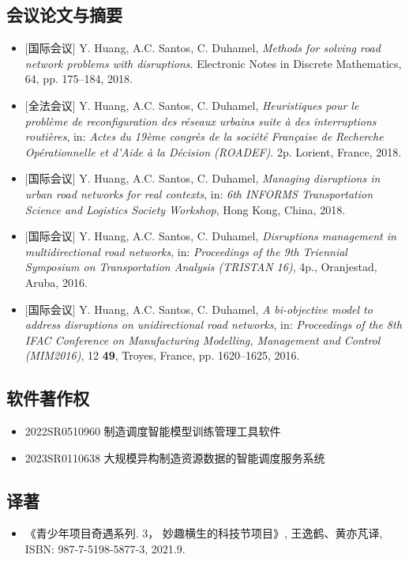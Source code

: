 \documentclass[letterpaper]{twentysecondcv} %
\begin{document}
\subsection{会议论文与摘要}
\begin{itemize}
    \item $[$国际会议$]$ Y. Huang, A.C. Santos, C. Duhamel, \textit{Methods for solving road network problems with disruptions}. Electronic Notes in Discrete Mathematics, 64, pp. 175--184, 2018.
    \item $[$全法会议$]$ Y. Huang, A.C. Santos, C. Duhamel, \textit{Heuristiques pour le problème de reconfiguration des réseaux urbains suite à des interruptions routières}, in: \textit{Actes du 19ème congrès de la société Française de Recherche Opérationnelle et d'Aide à la Décision (ROADEF)}. 2p. Lorient, France, 2018.
    \item $[$国际会议$]$ Y. Huang, A.C. Santos, C. Duhamel, \textit{Managing disruptions in urban road networks for real contexts}, in: \textit{6th INFORMS Transportation Science and Logistics Society Workshop}, Hong Kong, China, 2018.
    \item $[$国际会议$]$ Y. Huang, A.C. Santos, C. Duhamel, \textit{Disruptions management in multidirectional road networks}, in: \textit{Proceedings of the 9th Triennial Symposium on Transportation Analysis (TRISTAN 16)}, 4p., Oranjestad, Aruba, 2016.
    \item $[$国际会议$]$ Y. Huang, A.C. Santos, C. Duhamel, \textit{A bi-objective model to address disruptions on unidirectional road networks}, in: \textit{Proceedings of the 8th IFAC Conference on Manufacturing Modelling, Management and Control (MIM2016)}, 12 \textbf{49}, Troyes, France, pp. 1620--1625, 2016.
\end{itemize}

\vspace{-0.1cm}
\subsection{软件著作权}
\begin{itemize}
    \item 2022SR0510960 制造调度智能模型训练管理工具软件
    \item 2023SR0110638 大规模异构制造资源数据的智能调度服务系统
\end{itemize}

\vspace{-0.1cm}
\subsection{译著}
\begin{itemize}
    \item 《青少年项目奇遇系列. 3， 妙趣横生的科技节项目》, 王逸鹤、黄亦芃译, ISBN: 987-7-5198-5877-3, 2021.9.
\end{itemize}
\end{document}
